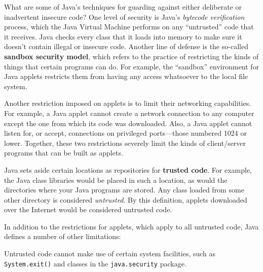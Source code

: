 {What are some of Java's techniques for guarding against either
deliberate or inadvertent insecure code?  One level of security is
Java's {\it bytecode verification} process, which the Java Virtual
Machine performs on any ``untrusted'' code that it receives.  Java
checks every class that it loads into memory to make sure it doesn't
contain illegal or insecure code.  Another line of defense is the
so-called {\bf sandbox security model}, which refers to the practice
of restricting the kinds of things that certain programs can do.  For
example, the ``sandbox'' environment for Java applets
restricts them from having any access whatsoever to the local file
system.

Another restriction imposed on applets is to limit their networking
capabilities.  For example, a Java applet cannot create a network
connection to any computer except the one from which its code was
downloaded.  Also, a Java applet cannot listen for, or accept,
connections on privileged ports---those numbered 1024 or
lower.  Together, these two restrictions severely limit the kinds of
client/server programs that can be built as applets.

Java sets aside certain locations as repositories for {\bf trusted
code}. For example, the Java class libraries would be placed in such a
location, as would the directories where your Java programs are
stored.  Any class loaded from some other directory is considered {\it
untrusted}. By this definition, applets downloaded over the Internet
would be considered untrusted code.

In addition to the restrictions for applets, which
apply to all untrusted code, Java defines a number of
other limitations:

\begin{BL}
\item  Untrusted code cannot make use of certain system
facilities, such as {\tt System.exit()} and classes
in the {\tt java.security} package.


\end{BL}}
